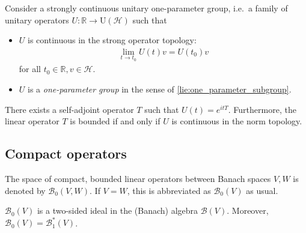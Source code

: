     \begin{theorem}[Stone]\label{functional:stone}
        Consider a strongly continuous unitary one-parameter group, i.e.~a family of unitary operators $U:\mathbb{R}\rightarrow\mathrm{U}(\mathcal{H})$ such that
        \begin{itemize}
            \item $U$ is continuous in the strong operator topology:
            \begin{gather}
                \lim_{t\rightarrow t_0}U(t)v=U(t_0)v
            \end{gather}
            for all $t_0\in\mathbb{R},v\in\mathcal{H}$.
            \item $U$ is a \textit{one-parameter group} in the sense of \cref{lie:one_parameter_subgroup}.
        \end{itemize}
        There exists a self-adjoint operator $T$ such that $U(t)=e^{itT}$. Furthermore, the linear operator $T$ is bounded if and only if $U$ is continuous in the norm topology.
    \end{theorem}

\subsection{Compact operators}



    \begin{notation}
        The space of compact, bounded linear operators between Banach spaces $V,W$ is denoted by $\mathcal{B}_0(V,W)$. If $V=W$, this is abbreviated as $\mathcal{B}_0(V)$ as usual.
    \end{notation}
    \begin{property}
        $\mathcal{B}_0(V)$ is a two-sided ideal in the (Banach) algebra $\mathcal{B}(V)$. Moreover, $\mathcal{B}_0(V)=\mathcal{B}_1^*(V)$.
    \end{property}

